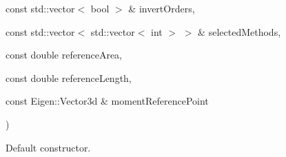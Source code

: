 {\begin{DoxyParamCaption}
\item[{const std\+::vector$<$ bool $>$ \&}]{invert\+Orders, }
\item[{const std\+::vector$<$ std\+::vector$<$ int $>$ $>$ \&}]{selected\+Methods, }
\item[{const double}]{reference\+Area, }
\item[{const double}]{reference\+Length, }
\item[{const Eigen\+::\+Vector3d \&}]{moment\+Reference\+Point}
\end{DoxyParamCaption}
)}\hypertarget{classtudat_1_1aerodynamics_1_1HypersonicLocalInclinationAnalysis_adce8ada2453063490dba0c93dff237b1}{}\label{classtudat_1_1aerodynamics_1_1HypersonicLocalInclinationAnalysis_adce8ada2453063490dba0c93dff237b1}


Default constructor. 

